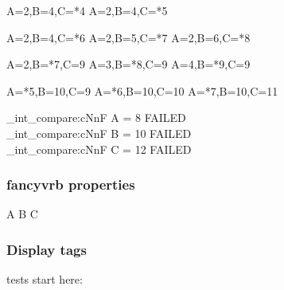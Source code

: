 \begin{CDRBlock} [
  tags=C,
  numbers=left,
  firstnumber=last,
]
A=2,B=4,C=*4
A=2,B=4,C=*5
\end{CDRBlock}

\begin{CDRBlock} [
  tags={C, B},
  numbers=left,
  firstnumber=last,
]
A=2,B=4,C=*6
A=2,B=5,C=*7
A=2,B=6,C=*8
\end{CDRBlock}

\begin{CDRBlock} [
  tags={B, A},
  numbers=left,
  firstnumber=last,
]
A=2,B=*7,C=9
A=3,B=*8,C=9
A=4,B=*9,C=9
\end{CDRBlock}
\begin{CDRBlock} [
  tags={A,C},
  numbers=left,
  firstnumber=last,
]
A=*5,B=10,C=9
A=*6,B=10,C=10
A=*7,B=10,C=11
\end{CDRBlock}

\ExplSyntaxOn
\CDR_int_compare:cNnF { A } = 8 { FAILED \\ }
\CDR_int_compare:cNnF { B } = {10} { FAILED \\ }
\CDR_int_compare:cNnF { C } = {12} { FAILED \\ }
\ExplSyntaxOff

\egroup

\subsubsection{\textsf{fancyvrb} properties}

\bgroup

\begin{CDRBlock} [
  pygments=false,
  tags=none,
  numbers=left,
  firstnumber=last,
]
A
B
C
\end{CDRBlock}

\newpage

\egroup

\subsubsection{Display tags}

\bgroup

tests start here:


